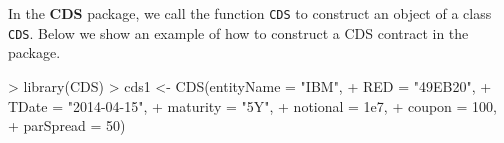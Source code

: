 \documentclass[a4paper]{article}
\renewenvironment{Schunk}{\vspace{\topsep}}{\vspace{\topsep}}
\begin{document}
In the \textbf{CDS} package, we call the function \texttt{CDS} to
construct an object of a class \texttt{CDS}. Below we show an example
of how to construct a CDS contract in the package.


\begin{Schunk}
\begin{Sinput}
> library(CDS)
> cds1 <- CDS(entityName = "IBM",
+             RED = "49EB20",
+             TDate = "2014-04-15",
+             maturity = "5Y",
+             notional = 1e7,
+             coupon = 100,
+             parSpread = 50)
\end{Sinput}
\end{Schunk}



\end{document}
